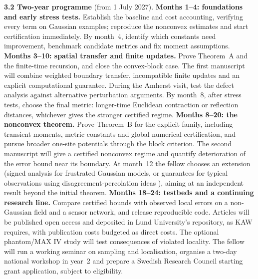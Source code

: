 \documentclass[12pt,a4paper]{article}
\begin{document}
\textbf{3.2 Two-year programme} (from 1 July 2027). \textbf{Months 1--4: foundations and early stress tests.} Establish the baseline and cost accounting, verifying every term on Gaussian examples; reproduce the nonconvex estimates and start certification immediately. By month~4, identify which constants need improvement, benchmark candidate metrics and fix moment assumptions.
\textbf{Months 3--10: spatial transfer and finite updates.} Prove Theorem~A and the finite-time recursion, and close the convex-block case. The first manuscript will combine weighted boundary transfer, incompatible finite updates and an explicit computational guarantee. During the Amherst visit, test the defect analysis against alternative perturbation arguments. By month~8, after stress tests, choose the final metric: longer-time Euclidean contraction or reflection distances, whichever gives the stronger certified regime.
\textbf{Months 8--20: the nonconvex theorem.} Prove Theorem~B for the explicit family, including transient moments, metric constants and global numerical certification, and pursue broader one-site potentials through the block criterion. The second manuscript will give a certified nonconvex regime and quantify deterioration of the error bound near its boundary. At month~12 the fellow chooses an extension (signed analysis for frustrated Gaussian models, or guarantees for typical observations using disagreement-percolation ideas \cite{vdBM94}), aiming at an independent result beyond the initial theorem.
\textbf{Months 18--24: testbeds and a continuing research line.} Compare certified bounds with observed local errors on a non-Gaussian field and a sensor network, and release reproducible code. Articles will be published open access and deposited in Lund University's repository, as KAW requires, with publication costs budgeted as direct costs. The optional phantom/MAX IV study will test consequences of violated locality. The fellow will run a working seminar on sampling and localisation, organise a two-day national workshop in year~2 and prepare a Swedish Research Council starting grant application, subject to eligibility.
\end{document}
